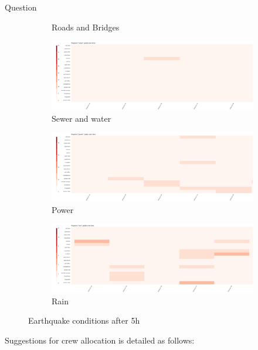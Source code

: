 \begin{section}{Question}
\begin{figure}[!h]
\begin{subfigure}[!h]{0.32\textwidth}
        \caption{Roads and Bridges}
        \label{fig:road_5h}
    \end{subfigure}
    \begin{subfigure}[!h]{0.32\textwidth}
        \centering
        \includegraphics[width=1.00\textwidth]{figs/cond_5h/cond_5h_sewer.png}
        \caption{Sewer and water}
        \label{fig:sewer_5h}
    \end{subfigure}
    \begin{subfigure}[!h]{0.32\textwidth}
        \centering
        \includegraphics[width=1.00\textwidth]{figs/cond_5h/cond_5h_power.png}
        \caption{Power}
        \label{fig:power_5h}
    \end{subfigure}
    \begin{subfigure}[!h]{0.32\textwidth}
        \centering
        \includegraphics[width=1.00\textwidth]{figs/cond_5h/cond_5h_rain.png}
        \caption{Rain}
        \label{fig:rain_5h}
    \end{subfigure}
    \caption{Earthquake conditions after 5h}
    \label{fig:eq_cond_5h}
\end{figure}

Suggestions for crew allocation is detailed as follows: 


\end{section}
